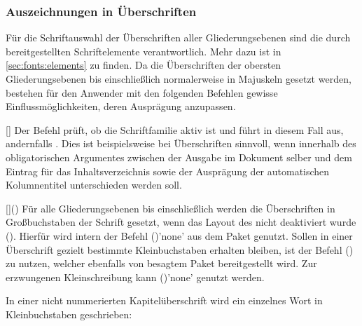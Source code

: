 \begin{Declaration*}{}
\begin{Declaration*}{}
\begin{Declaration*}{}
\subsubsection{Auszeichnungen in Überschriften}
%
%
Für die Schriftauswahl der Überschriften aller Gliederungsebenen sind die durch 
\KOMAScript{} bereitgestellten Schriftelemente verantwortlich. Mehr dazu ist in 
\autoref{sec:fonts:elements} zu finden. Da die Überschriften der obersten 
Gliederungsebenen bis einschließlich  normalerweise in 
Majuskeln gesetzt werden, bestehen für den Anwender mit den folgenden Befehlen 
gewisse Einflussmöglichkeiten, deren Ausprägung anzupassen.

\begin{Declaration}{[]}%
\printdeclarationlist%
%
%
%
%
Der Befehl  prüft, ob die Schriftfamilie \DIN aktiv ist und führt 
in diesem Fall  aus, andernfalls . 
Dies ist beispielsweise bei Überschriften sinnvoll, wenn innerhalb des 
obligatorischen Argumentes zwischen der Ausgabe im Dokument selber und dem 
Eintrag für das Inhaltsverzeichnis sowie der Ausprägung der automatischen 
Kolumnentitel unterschieden werden soll.
\end{Declaration}

\begin{Declaration}{[]()}%
\printdeclarationlist%
%
%
%
Für alle Gliederungsebenen bis einschließlich  werden die 
Überschriften in Großbuchstaben der Schrift \DIN gesetzt, wenn das Layout des 
\CDs nicht deaktiviert wurde (). Hierfür wird intern der 
Befehl ()'none' aus dem Paket 
 genutzt. Sollen in einer Überschrift gezielt bestimmte 
Kleinbuchstaben erhalten bleiben, ist der Befehl 
() zu nutzen, welcher ebenfalls von 
besagtem Paket bereitgestellt wird. Zur erzwungenen Kleinschreibung kann 
()'none' genutzt werden.
\end{Declaration}
%
\begin{Example}
In einer nicht nummerierten Kapitelüberschrift wird ein einzelnes Wort in 
Kleinbuchstaben geschrieben:
\begin{Code}[escapechar=§]
\end{Code}
\end{Example}




\end{Declaration*}
\end{Declaration*}
\end{Declaration*}
